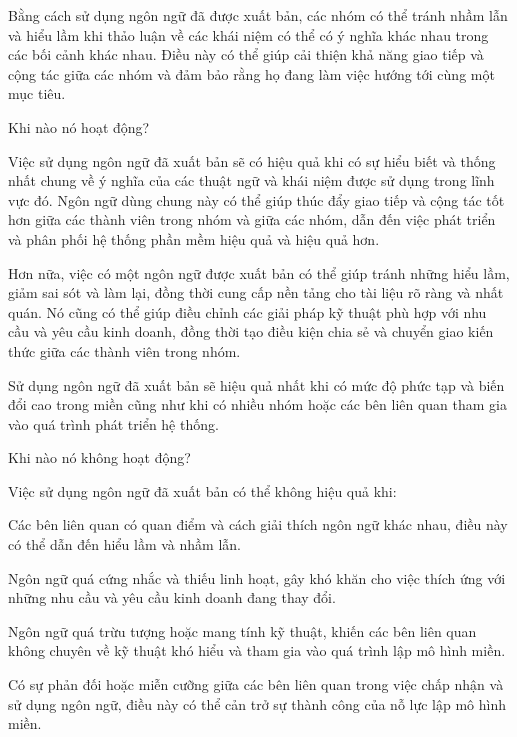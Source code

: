 Bằng cách sử dụng ngôn ngữ đã được xuất bản, các nhóm có thể tránh nhầm lẫn và hiểu lầm khi thảo luận về các khái niệm có thể có ý nghĩa khác nhau trong các bối cảnh khác nhau. Điều này có thể giúp cải thiện khả năng giao tiếp và cộng tác giữa các nhóm và đảm bảo rằng họ đang làm việc hướng tới cùng một mục tiêu.

Khi nào nó hoạt động?

Việc sử dụng ngôn ngữ đã xuất bản sẽ có hiệu quả khi có sự hiểu biết và thống nhất chung về ý nghĩa của các thuật ngữ và khái niệm được sử dụng trong lĩnh vực đó. Ngôn ngữ dùng chung này có thể giúp thúc đẩy giao tiếp và cộng tác tốt hơn giữa các thành viên trong nhóm và giữa các nhóm, dẫn đến việc phát triển và phân phối hệ thống phần mềm hiệu quả và hiệu quả hơn.

Hơn nữa, việc có một ngôn ngữ được xuất bản có thể giúp tránh những hiểu lầm, giảm sai sót và làm lại, đồng thời cung cấp nền tảng cho tài liệu rõ ràng và nhất quán. Nó cũng có thể giúp điều chỉnh các giải pháp kỹ thuật phù hợp với nhu cầu và yêu cầu kinh doanh, đồng thời tạo điều kiện chia sẻ và chuyển giao kiến thức giữa các thành viên trong nhóm.

Sử dụng ngôn ngữ đã xuất bản sẽ hiệu quả nhất khi có mức độ phức tạp và biến đổi cao trong miền cũng như khi có nhiều nhóm hoặc các bên liên quan tham gia vào quá trình phát triển hệ thống.

Khi nào nó không hoạt động?

Việc sử dụng ngôn ngữ đã xuất bản có thể không hiệu quả khi:

Các bên liên quan có quan điểm và cách giải thích ngôn ngữ khác nhau, điều này có thể dẫn đến hiểu lầm và nhầm lẫn.

Ngôn ngữ quá cứng nhắc và thiếu linh hoạt, gây khó khăn cho việc thích ứng với những nhu cầu và yêu cầu kinh doanh đang thay đổi.

Ngôn ngữ quá trừu tượng hoặc mang tính kỹ thuật, khiến các bên liên quan không chuyên về kỹ thuật khó hiểu và tham gia vào quá trình lập mô hình miền.

Có sự phản đối hoặc miễn cưỡng giữa các bên liên quan trong việc chấp nhận và sử dụng ngôn ngữ, điều này có thể cản trở sự thành công của nỗ lực lập mô hình miền.


